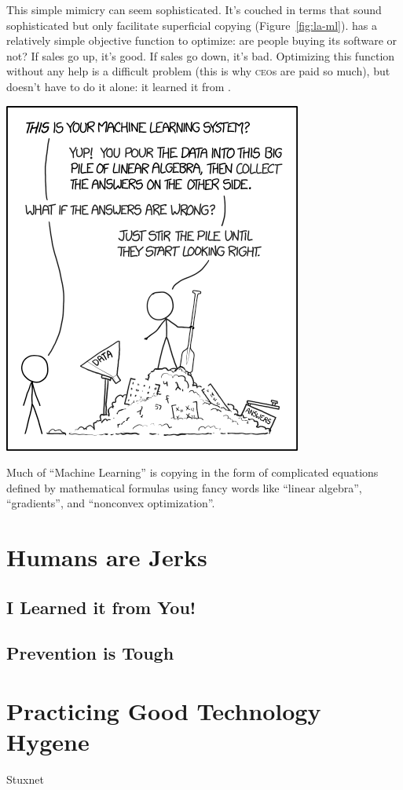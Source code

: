 This simple mimicry can seem sophisticated.  It's couched in terms
that sound sophisticated but only facilitate superficial copying
(Figure~\ref{fig:la-ml}).  \energyCompany{} has a relatively simple
objective function to optimize: are people buying its
software or not?  If sales go up, it's good.  If sales go down, it's
bad.  Optimizing this function without any help is a difficult problem
(this is why \textsc{ceo}s are paid so much), but \energyCompany{}
doesn't have to do it alone: it learned it from \energyJerk{}.

\begin{marginfigure}%
  \includegraphics[width=\linewidth]{figures/xkcd-la-ml}
  \caption{Much of ``Machine Learning'' is copying in the form of
    complicated equations defined by mathematical formulas using fancy
    words like ``linear algebra'', ``gradients'', and ``nonconvex optimization''.}
  \label{fig:la-ml}
\end{marginfigure}

\section{Humans are Jerks}




\subsection{I Learned it from You!}

\subsection{Prevention is Tough}

\section{Practicing Good Technology Hygene}

Stuxnet
